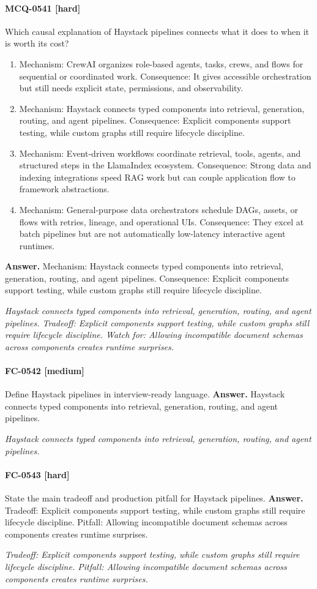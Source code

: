 \paragraph{MCQ-0541 [hard]} Which causal explanation of Haystack pipelines connects what it does to when it is worth its cost?
\begin{enumerate}[label=\Alph*.]
\item Mechanism: CrewAI organizes role-based agents, tasks, crews, and flows for sequential or coordinated work. Consequence: It gives accessible orchestration but still needs explicit state, permissions, and observability.
\item Mechanism: Haystack connects typed components into retrieval, generation, routing, and agent pipelines. Consequence: Explicit components support testing, while custom graphs still require lifecycle discipline.
\item Mechanism: Event-driven workflows coordinate retrieval, tools, agents, and structured steps in the LlamaIndex ecosystem. Consequence: Strong data and indexing integrations speed RAG work but can couple application flow to framework abstractions.
\item Mechanism: General-purpose data orchestrators schedule DAGs, assets, or flows with retries, lineage, and operational UIs. Consequence: They excel at batch pipelines but are not automatically low-latency interactive agent runtimes.
\end{enumerate}
\noindent\textbf{Answer.} Mechanism: Haystack connects typed components into retrieval, generation, routing, and agent pipelines. Consequence: Explicit components support testing, while custom graphs still require lifecycle discipline.
\par\textit{Haystack connects typed components into retrieval, generation, routing, and agent pipelines. Tradeoff: Explicit components support testing, while custom graphs still require lifecycle discipline. Watch for: Allowing incompatible document schemas across components creates runtime surprises.}
\paragraph{FC-0542 [medium]} Define Haystack pipelines in interview-ready language.
\noindent\textbf{Answer.} Haystack connects typed components into retrieval, generation, routing, and agent pipelines.
\par\textit{Haystack connects typed components into retrieval, generation, routing, and agent pipelines.}
\paragraph{FC-0543 [hard]} State the main tradeoff and production pitfall for Haystack pipelines.
\noindent\textbf{Answer.} Tradeoff: Explicit components support testing, while custom graphs still require lifecycle discipline. Pitfall: Allowing incompatible document schemas across components creates runtime surprises.
\par\textit{Tradeoff: Explicit components support testing, while custom graphs still require lifecycle discipline. Pitfall: Allowing incompatible document schemas across components creates runtime surprises.}
